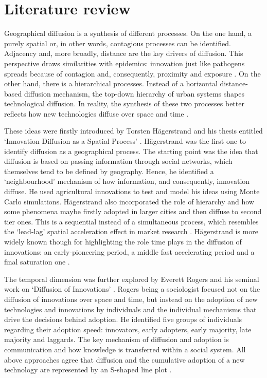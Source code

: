 \documentclass[
  authoryear,
  preprint,
  3p]{elsarticle}
\begin{document}
\section{Literature review}\label{sec-litreview}

Geographical diffusion is a synthesis of different processes. On the one
hand, a purely spatial or, in other words, contagious processes can be
identified. Adjacency and, more broadly, distance are the key drivers of
diffusion. This perspective draws similarities with epidemics:
innovation just like pathogens spreads because of contagion and,
consequently, proximity and exposure \citep{hivner2003facilitating}. On
the other hand, there is a hierarchical processes. Instead of a
horizontal distance-based diffusion mechanism, the top-down hierarchy of
urban systems shapes technological diffusion. In reality, the synthesis
of these two processes better reflects how new technologies diffuse over
space and time \citep{morrill2020spatial}.

These ideas were firstly introduced by Torsten Hägerstrand and his
thesis entitled `Innovation Diffusion as a Spatial Process'
\citep{hagerstrand1968innovation}. Hägerstrand was the first one to
identify diffusion as a geographical process. The starting point was the
idea that diffusion is based on passing information through social
networks, which themselves tend to be defined by geography. Hence, he
identified a `neighbourhood' mechanism of how information, and
consequently, innovation diffuse. He used agricultural innovations to
test and model his ideas using Monte Carlo simulations. Hägerstrand also
incorporated the role of hierarchy and how some phenomena maybe firstly
adopted in larger cities and then diffuse to second tier ones. This is a
sequential instead of a simultaneous process, which resembles the
`lead-lag' spatial acceleration effect in market research
\citep{bento2018time, PERES201091}. Hägerstrand is more widely known
though for highlighting the role time plays in the diffusion of
innovations: an early-pioneering period, a middle fast accelerating
period and a final saturation one \citep{morrill2020spatial}.

The temporal dimension was further explored by Everett Rogers and his
seminal work on `Diffusion of Innovations' \citep{rogers2010diffusion}.
Rogers being a sociologist focused not on the diffusion of innovations
over space and time, but instead on the adoption of new technologies and
innovations by individuals and the individual mechanisms that drive the
decisions behind adoption. He identified five groups of individuals
regarding their adoption speed: innovators, early adopters, early
majority, late majority and laggards. The key mechanism of diffusion and
adoption is communication and how knowledge is transferred within a
social system. All above approaches agree that diffusion and the
cumulative adoption of a new technology are represented by an S-shaped
line plot \citep{grubler1990rise}.
\end{document}
